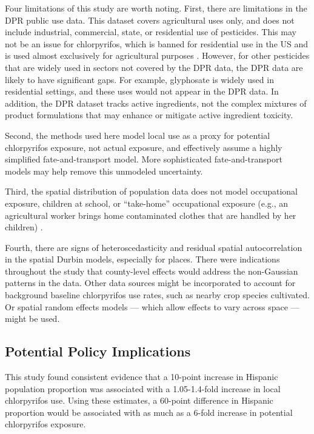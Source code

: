 \documentclass[ijerph,article,submit,oneauthor,pdftex]{Definitions/mdpi}
\begin{document}
Four limitations of this study are worth noting. First, there are limitations in the DPR public use data. This dataset covers agricultural uses only, and does not include industrial, commercial, state, or residential use of pesticides. This may not be an issue for chlorpyrifos, which is banned for residential use in the US and is used almost exclusively for agricultural purposes \citet[table 2]{SegawaEvaluationOptionsInterim2017}. However, for other pesticides that are widely used in sectors not covered by the DPR data, the DPR data are likely to have significant gaps. For example, glyphosate is widely used in residential settings, and these uses would not appear in the DPR data. In addition, the DPR dataset tracks active ingredients, not the complex mixtures of product formulations that may enhance or mitigate active ingredient toxicity.

Second, the methods used here model local use as a proxy for potential chlorpyrifos exposure, not actual exposure, and effectively assume a highly simplified fate-and-transport model. More sophisticated fate-and-transport models may help remove this unmodeled uncertainty.

Third, the spatial distribution of population data does not model occupational exposure, children at school, or ``take-home'' occupational exposure (e.g., an agricultural worker brings home contaminated clothes that are handled by her children) \citep{ParkMultiContextualSegregationEnvironmental2017}.

Fourth, there are signs of heteroscedasticity and residual spatial autocorrelation in the spatial Durbin models, especially for places. There were indications throughout the study that county-level effects would address the non-Gaussian patterns in the data. Other data sources might be incorporated to account for background baseline chlorpyrifos use rates, such as nearby crop species cultivated. Or spatial random effects models --- which allow effects to vary across space --- might be used.

\hypertarget{potential-policy-implications}{%
\subsection{Potential Policy Implications}\label{potential-policy-implications}}

This study found consistent evidence that a 10-point increase in Hispanic population proportion was associated with a 1.05-1.4-fold increase in local chlorpyrifos use. Using these estimates, a 60-point difference in Hispanic proportion would be associated with as much as a 6-fold increase in potential chlorpyrifos exposure.
\end{document}
